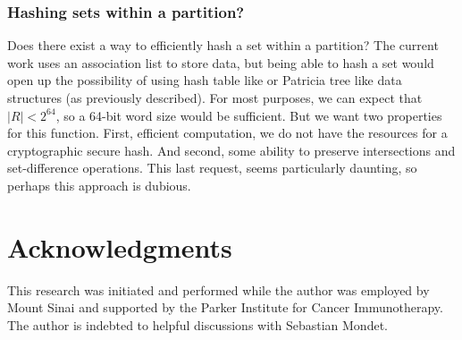 \documentclass{article}
\begin{document}
\subsubsection{Hashing sets within a partition?}

Does there exist a way to efficiently hash a set within a partition?
The current work uses an association list to store data, but being able to
hash a set would open up the possibility of using hash table like
or Patricia tree like data structures (as previously
described\cite{Okasaki1998}).
For most purposes,
we can expect that $|R|<2^{64}$,
so a 64-bit word size would be sufficient.
But we want two properties for this function.
First, efficient computation, we do not have the resources for a cryptographic
secure hash.
And second,
some ability to preserve intersections and set-difference operations.
This last request, seems particularly daunting,
so perhaps this approach is dubious.

\section{Acknowledgments}

This research was initiated and performed while the author was employed by
Mount Sinai and supported by the Parker Institute for Cancer Immunotherapy.
The author is indebted to helpful discussions with Sebastian Mondet.

\clearpage



\end{document}
